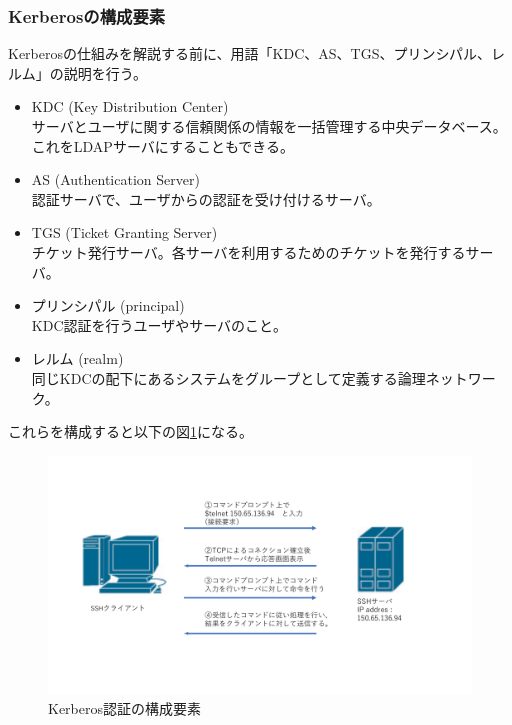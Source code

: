 \documentclass[11pt,a4j,titlepage]{jreport}
\begin{document}
\subsubsection*{Kerberosの構成要素}
Kerberosの仕組みを解説する前に、用語「KDC、AS、TGS、プリンシパル、レルム」の説明を行う。
\begin{itemize}
    \setlength{\parskip}{0.1cm} %
    \setlength{\itemsep}{0.1cm} 
    \item KDC (Key Distribution Center)\mbox{}\\サーバとユーザに関する信頼関係の情報を一括管理する中央データベース。これをLDAPサーバにすることもできる。
    \item AS (Authentication Server) \mbox{}\\認証サーバで、ユーザからの認証を受け付けるサーバ。
    \item TGS (Ticket Granting Server) \mbox{}\\チケット発行サーバ。各サーバを利用するためのチケットを発行するサーバ。
    \item プリンシパル (principal) \mbox{}\\ KDC認証を行うユーザやサーバのこと。
    \item レルム (realm)\mbox{}\\同じKDCの配下にあるシステムをグループとして定義する論理ネットワーク。
\end{itemize}
これらを構成すると以下の図\ref{KerberosCompornent}になる。
\begin{figure}[tbp]
    \begin{center}
        \includegraphics[width=1.0\textwidth, page=11]{graphs/network_archtecture.pdf}
        \caption{Kerberos認証の構成要素}
        \label{KerberosCompornent}
    \end{center}
\end{figure}\\
\end{document}
